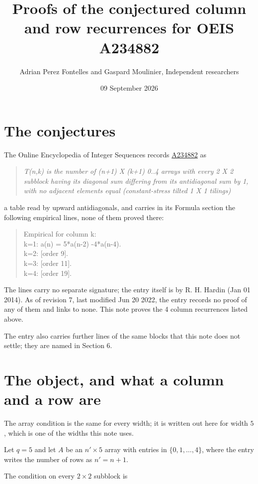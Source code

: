 \documentclass[11pt]{article}
\title{Proofs of the conjectured column and row recurrences for OEIS A234882}
\author{Adrian Perez Fontelles and Gaspard Moulinier, Independent researchers}
\date{09 September 2026}
\theoremstyle{definition}
\begin{document}
\maketitle
\section{The conjectures}

The Online Encyclopedia of Integer Sequences records \href{https://oeis.org/A234882}{A234882} as

\begin{quote}\itshape T(n,k) is the number of (n+1) X (k+1) 0..4 arrays with every 2 X 2 subblock having its diagonal sum differing from its antidiagonal sum by 1, with no adjacent elements equal (constant-stress tilted 1 X 1 tilings)\end{quote}

a table read by upward antidiagonals, and carries in its Formula section the following empirical lines, none of them proved there:

\begin{quote}\ttfamily Empirical for column k:\\
k=1: a(n) = 5*a(n-2) -4*a(n-4).\\k=2: [order 9].\\k=3: [order 11].\\k=4: [order 19].\end{quote}

The lines carry no separate signature; the entry itself is by R. H. Hardin (Jan 01 2014). As of revision 7, last modified Jun 20 2022, the entry records no proof of any of them and links to none. This note proves the 4 column recurrences listed above.

The entry also carries further lines of the same blocks that this note does not settle; they are named in Section 6.

\section{The object, and what a column and a row are}

The array condition is the same for every width; it is written out here for width $5$, which is one of the widths this note uses.

Let $q = 5$ and let $A$ be an $n' \times 5$ array with entries in $\{0,1,\dots,4\}$, where the entry writes the number of rows as $n' = n + 1$.

The condition on every $2 \times 2$ subblock is
\end{document}
